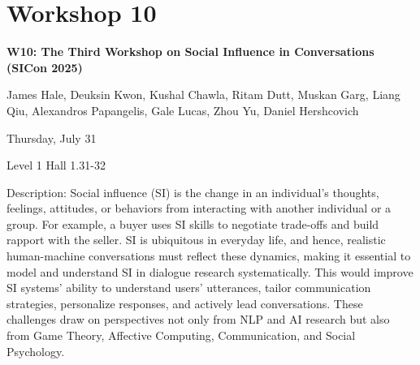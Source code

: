 \clearpage


\section[W10: The Third Workshop on Social Influence in Conversations (SICon 2025)]{Workshop 10}
\label{workshop_10}

\begin{center}
    {\Large \textbf{W10: The Third Workshop on Social Influence in Conversations (SICon 2025)}}

    James Hale, Deuksin Kwon, Kushal Chawla, Ritam Dutt, Muskan Garg, Liang Qiu, Alexandros Papangelis, Gale Lucas, Zhou Yu, Daniel Hershcovich

   Thursday, July 31
    
    Level 1 Hall 1.31-32

\end{center}
	
Description: Social influence (SI) is the change in an individual's thoughts, feelings, attitudes, or behaviors from interacting with another individual or a group. For example, a buyer uses SI skills to negotiate trade-offs and build rapport with the seller. SI is ubiquitous in everyday life, and hence, realistic human-machine conversations must reflect these dynamics, making it essential to model and understand SI in dialogue research systematically. This would improve SI systems' ability to understand users’ utterances, tailor communication strategies, personalize responses, and actively lead conversations. These challenges draw on perspectives not only from NLP and AI research but also from Game Theory, Affective Computing, Communication, and Social Psychology.



